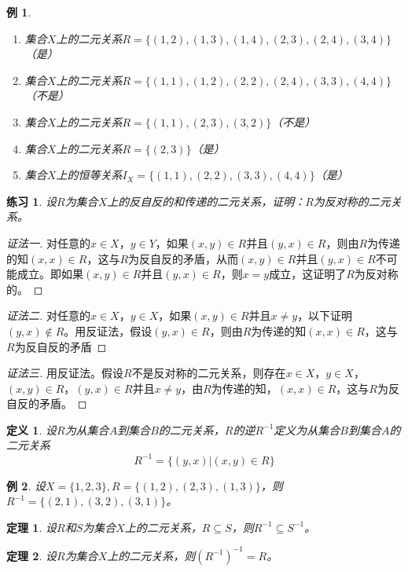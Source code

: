 \documentclass{article}
\newtheorem{Def}{定义}
\newtheorem{Thm}{定理}
\newtheorem{Exercise}{练习}
\newtheorem{Example}{例}
\begin{document}
\begin{CJK*}{UTF8}{gbsn}
\begin{Example}
  \begin{enumerate}
  \item 集合$X$上的二元关系$R=\{(1,2), (1,3), (1,4), (2,3),
    (2,4), (3,4)\}$（是）
  \item 集合$X$上的二元关系$R=\{(1,1), (1,2), (2,2),
    (2,4), (3,3), (4,4)\}$（不是）
  \item 集合$X$上的二元关系$R = \{(1,1), (2,3), (3,2)\}$（不是）
  \item 集合$X$上的二元关系$R = \{(2,3)\}$（是）
  \item 集合$X$上的恒等关系$I_X = \{(1,1), (2,2), (3,3),(4,4)\}$（是）
  \end{enumerate}
\end{Example}
\begin{Exercise}
  设$R$为集合$X$上的反自反的和传递的二元关系，证明：$R$为反对称的二元关系。  
  \end{Exercise}
  \begin{proof}[证法一]对任意的$x\in X$，$y\in Y$，如果$(x,y)\in R$并且$(y,x)\in R$，则由$R$为传递的知$(x,x)\in R$，这与$R$为反自反的矛盾，从而$(x,y)\in R$并且$(y,x)\in R$不可能成立。即如果$(x,y)\in R$并且$(y,x)\in R$，则$x=y$成立，这证明了$R$为反对称的。
    
  \end{proof}
  \begin{proof}[证法二]
   对任意的$x\in X$，$y\in X$，如果$(x,y)\in R$并且$x\neq y$，以下证明$(y,x)\notin R$。用反证法，假设$(y,x)\in R$，则由$R$为传递的知$(x,x)\in R$，这与$R$为反自反的矛盾 
  \end{proof}
  \begin{proof}[证法三]
    用反证法。假设$R$不是反对称的二元关系，则存在$x\in X$，$y\in X$，$(x,y)\in R$，$(y,x)\in R$并且$x\neq y$，由$R$为传递的知，$(x,x)\in R$，这与$R$为反自反的矛盾。
  \end{proof}

\begin{Def}
    设$R$为从集合$A$到集合$B$的二元关系，$R$的逆$R^{-1}$定义为从集合$B$到集合$A$的二元关系
    \[R^{-1}=\{(y,x)|(x,y)\in R\}\]
  \end{Def}
  \begin{Example}
    设$X=\{1,2,3\}, R=\{(1,2),(2,3),(1,3)\}$，则$R^{-1}=\{(2,1),(3,2),(3,1)\}$。
  \end{Example}
  \begin{Thm}
    设$R$和$S$为集合$X$上的二元关系，$R\subseteq S$，则$R^{-1}\subseteq S^{-1}$。
  \end{Thm}  
  \begin{Thm}
    设$R$为集合$X$上的二元关系，则$(R^{-1})^{-1}=R$。
  \end{Thm}  


\end{CJK*}
\end{document}
